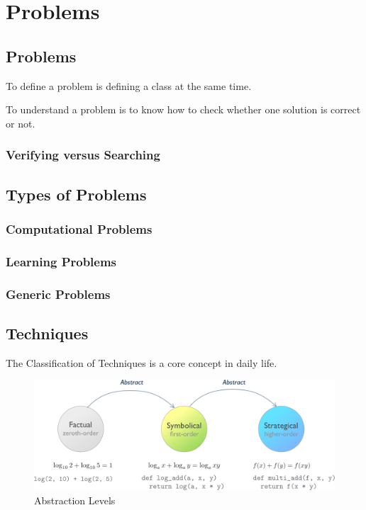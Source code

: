 \chapter{Problems}

\section{Problems}

To define a problem is defining a class at the same time.

To understand a problem is to know how to check whether one solution is correct or not.
\subsection{Verifying versus Searching}


\section{Types of Problems}
\subsection{Computational Problems}
\subsection{Learning Problems}
\subsection{Generic Problems}

\section{Techniques}
The Classification of Techniques is a core concept in daily life.
\begin{figure}
  \includegraphics[width=\linewidth]{img/abstract-levels.png}
  \caption{Abstraction Levels}
  \label{fig:abstract-levels}
\end{figure}
